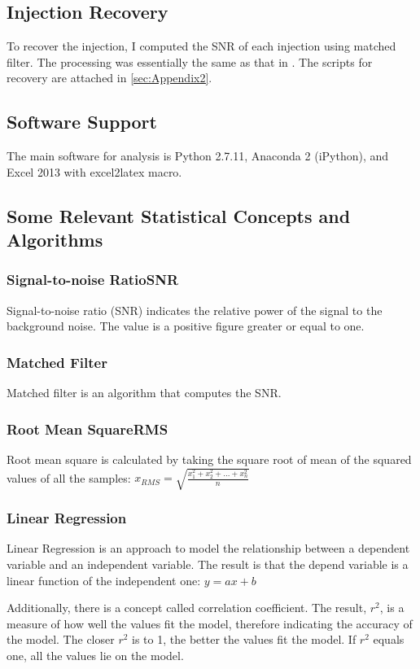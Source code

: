 \documentclass[aps,prd,preprint]{revtex4}
\begin{document}
\subsection{Injection Recovery \label{sec:Recovery}}
To recover the injection, I computed the SNR of each injection using matched filter. The processing was essentially the same as that in \cite{GWTutorial}. The scripts for recovery are attached in \ref{sec:Appendix2}.

\subsection{Software Support}
The main software for analysis is Python 2.7.11, Anaconda 2 (iPython), and Excel 2013 with excel2latex macro.

\subsection{Some Relevant Statistical Concepts and Algorithms}
\subsubsection{Signal-to-noise Ratio\textemdash SNR}
Signal-to-noise ratio (SNR) \cite{SNR} indicates the relative power of the signal to the background noise. The value is a positive figure greater or equal to one.
\subsubsection{Matched Filter}
Matched filter \cite{findChirp} is an algorithm that computes the SNR.
\subsubsection{Root Mean Square\textemdash RMS}
Root mean square is calculated by taking the square root of mean of the squared values of all the samples: $x_{RMS} = \sqrt{\frac{x_1^2 + x_2^2 + ... + x_n^2}{n}}$ \cite{RMS}
\subsubsection{Linear Regression}
Linear Regression is an approach to model the relationship between a dependent variable and an independent variable. The result is that the depend variable is a linear function of the independent one: $y = ax+b$ \cite{regression}
\par Additionally, there is a concept called correlation coefficient. The result, $r^2$, is a measure of how well the values fit the model, therefore indicating the accuracy of the model. The closer $r^2$ is to 1, the better the values fit the model. If $r^2$ equals one, all the values lie on the model. \cite{r_squared}
\end{document}
